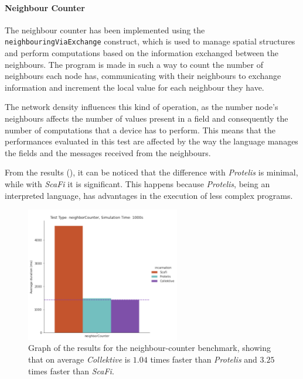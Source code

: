 \paragraph{Neighbour Counter}
The neighbour counter has been implemented using the \texttt{neighbouringViaExchange} construct, which is used to
manage spatial structures and perform computations based on the information exchanged between the neighbours.
The program is made in such a way to count the number of neighbours each node has, communicating with their neighbours
to exchange information and increment the local value for each neighbour they have.

The network density influences this kind of operation, as the number node's neighbours affects the number of
values present in a field and consequently the number of computations that a device has to perform.
This means that the performances evaluated in this test are affected by the way the language manages the fields and the
messages received from the neighbours.

From the results (), it can be noticed that the difference with \emph{Protelis} is minimal,
while with \emph{ScaFi} it is significant.
This happens because \emph{Protelis}, being an interpreted language, has advantages in the execution of less complex programs.

\begin{figure}[ht!]
    \centering
    \includegraphics[width=0.6\textwidth]{figures/neighboring-results}
    \caption{Graph of the results for the neighbour-counter benchmark, showing that on average \emph{Collektive} is $1.04$ times faster
    than \emph{Protelis} and $3.25$ times faster than \emph{ScaFi}.}
    \label{fig:neghbour-counter}
\end{figure}


